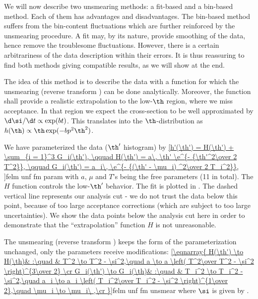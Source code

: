 We will now describe two unsmearing methods: a fit-based and a bin-based method. Each of them has advantages and disadvantages. The bin-based method suffers from the bin-content fluctuations which are further reinforced by the unsmearing procedure. A fit may, by its nature, provide smoothing of the data, hence remove the troublesome fluctuations. However, there is a certain arbitrariness of the data description within their errors. It is thus reassuring to find both methods giving compatible results, as we will show at the end.



The idea of this method is to describe the data with a function for which the unsmearing (reverse transform ) can be done analytically. Moreover, the function shall provide a realistic extrapolation to the low-$\th$ region, where we miss acceptance. In that region we expect the cross-section to be well approximated by $\d\si/\d t \propto \exp(bt)$. This translates into the $\th$-distribution as $h(\th) \propto \th \exp(-bp^2 \th^2)$.

We have parameterized the data ($\th'$ histogram) by
\eqref{h'(\th') = H(\th') + \sum_{i = 1}^3 G_i(\th'),
	\qquad H(\th') = a\, \th' \e^{- {\th'^2\over 2 T^2}},
	\qquad G_i(\th') = a_i\, \e^{- {(\th' - \mu_i) ^2\over 2 T_i^2}},
}{felm unf fm param}
with $a$, $\mu$ and $T$'s being the free parameters (11 in total). The $H$ function controls the low-$\th'$ behavior. The fit is plotted in . The dashed vertical line represents our analysis cut - we do not trust the data below this point, because of too large acceptance corrections (which are subject to too large uncertainties). We show the data points below the analysis cut here in order to demonstrate that the ``extrapolation'' function $H$ is not unreasonable.

\bmfig
{}
\emfig

The unsmearing (reverse transform ) keeps the form of the parameterization  unchanged, only the parameters receive modifications:
\eqref{\eqnarray{
H(\th') \to H(\th)& :\quad & T^2 \to T^2 - \si^2,\quad a \to a \left( T^2\over T^2 - \si^2 \right)^{3\over 2} \cr
G_i(\th') \to G_i(\th)& :\quad & T_i^2 \to T_i^2 - \si^2,\quad a_i \to a_i \left( T_i^2\over T_i^2 - \si^2 \right)^{1\over 2},\quad \mu_i \to \mu_i\ ,\cr
}}{felm unf fm unsmear}
where $\si$ is given by .

